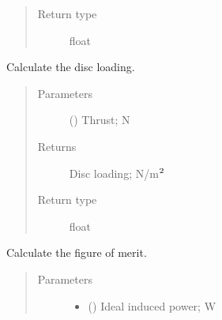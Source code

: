 \documentclass[letterpaper,10pt,english]{sphinxmanual}
\begin{document}
\begin{fulllineitems}
\begin{fulllineitems}
\begin{quote}
\begin{description}
\item[{Return type}] \leavevmode
\sphinxAtStartPar
float

\end{description}\end{quote}

\end{fulllineitems}


\begin{fulllineitems}
\label{\detokenize{modules/rotor:rotor.Rotor.get_disc_loading}}
\sphinxAtStartPar
Calculate the disc loading.
\begin{quote}\begin{description}
\item[{Parameters}] \leavevmode
\sphinxAtStartPar
{} () \textendash{} Thrust; N

\item[{Returns}] \leavevmode
\sphinxAtStartPar
Disc loading; N/m\(\sp{\text{2}}\)

\item[{Return type}] \leavevmode
\sphinxAtStartPar
float

\end{description}\end{quote}

\end{fulllineitems}


\begin{fulllineitems}
\label{\detokenize{modules/rotor:rotor.Rotor.get_figure_of_merit}}
\sphinxAtStartPar
Calculate the figure of merit.
\begin{quote}\begin{description}
\item[{Parameters}] \leavevmode\begin{itemize}
\item {} 
\sphinxAtStartPar
{} () \textendash{} Ideal induced power; W


\end{itemize}
\end{description}
\end{quote}
\end{fulllineitems}
\end{fulllineitems}
\end{document}
